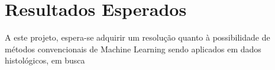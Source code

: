 \section{Resultados Esperados}

A este projeto, espera-se adquirir um resolução quanto à possibilidade de métodos convencionais de Machine Learning sendo aplicados em dados histológicos, em busca 

